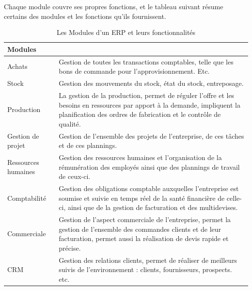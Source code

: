 Chaque module couvre ses propres fonctions, et le tableau suivant résume certains des modules et les fonctions qu'ils fournissent.

\begin{table}[H]
    \begin{center}
        
        \begin{tabular}{|F{4cm}|R{10cm}|}
            \hline
            \textbf{Modules}  &  \\
            \hline
            Achats
            &
            Gestion de toutes les transactions comptables, telle que les bons de commande pour l’approvisionnement. Etc.\\
            
            \hline
            Stock
            &
            Gestion des mouvements du stock, état du stock, entreposage.\\
            
            \hline
            Production
            &
            La gestion de la production, permet de réguler l’offre et les besoins en
            ressources par apport à la demande, impliquent la planification des ordres
            de fabrication et le contrôle de qualité.\\
            
            \hline
            Gestion de projet
            &
            Gestion de l’ensemble des projets de l’entreprise, de ces tâches et de ces plannings.\\
            
            \hline
            Ressources humaines
            &
            Gestion des ressources humaines et l’organisation de la rémunération des employés ainsi que des plannings de travail de ceux-ci.\\
            
            
            \hline
            Comptabilité
            &
            Gestion des obligations comptable auxquelles l’entreprise est soumise et suivie en temps réel de la santé financière de celle-ci, ainsi que de la gestion de facturation et des multidevises.\\
            
            \hline
            Commerciale
            &
            Gestion de l’aspect commerciale de l’entreprise, permet la gestion de l’ensemble des commandes clients et de leur facturation, permet aussi la réalisation de devis rapide et précise.\\
            
            \hline
            CRM
            &
            Gestion des relations clients, permet de réaliser de meilleurs suivis de
            l’environnement : clients, fournisseurs, prospects. etc.\\
            
            
            \hline
        \end{tabular}	
        \caption{Les Modules d'un ERP et leurs fonctionnalités}
    \end{center}
\end{table}

